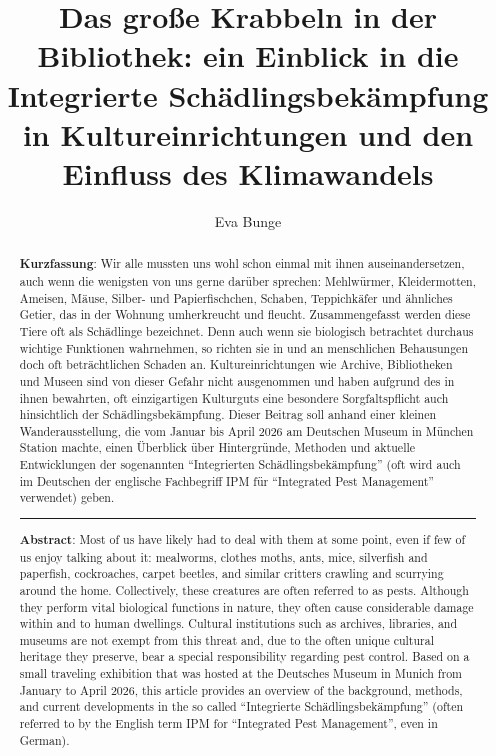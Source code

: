 \documentclass[a4paper,
fontsize=11pt,
oneside,
numbers=noperiodatend,
parskip=half-,
bibliography=totoc,
final
]{scrartcl}
\title{\LARGE{Das große Krabbeln in der Bibliothek: ein Einblick in die Integrierte Schädlingsbekämpfung in Kultureinrichtungen und den Einfluss des Klimawandels}}%
\author{Eva Bunge} %
\date{}
\begin{document}
\maketitle
\thispagestyle{fancyplain} 

\begin{abstract}
\noindent
\textbf{Kurzfassung}: Wir alle mussten uns wohl schon einmal mit ihnen
auseinandersetzen, auch wenn die wenigsten von uns gerne darüber
sprechen: Mehlwürmer, Kleidermotten, Ameisen, Mäuse, Silber- und
Papierfischchen, Schaben, Teppichkäfer und ähnliches Getier, das in der
Wohnung umherkreucht und fleucht. Zusammengefasst werden diese Tiere oft
als Schädlinge bezeichnet. Denn auch wenn sie biologisch betrachtet
durchaus wichtige Funktionen wahrnehmen, so richten sie in und an \linebreak
menschlichen Behausungen doch oft beträchtlichen Schaden an.
Kultureinrichtungen wie Archive, Bibliotheken und Museen sind von dieser
Gefahr nicht ausgenommen und haben aufgrund des in ihnen bewahrten, oft
einzigartigen Kulturguts eine besondere Sorgfaltspflicht auch
hinsichtlich der Schädlingsbekämpfung. Dieser Beitrag soll anhand einer
kleinen Wanderausstellung, die vom Januar bis April 2026 am Deutschen
Museum in München Station machte, einen Überblick über Hintergründe,
Methoden und aktuelle Entwicklungen der sogenannten \enquote{Integrierten
Schädlingsbekämpfung} (oft wird auch im Deutschen der englische
Fachbegriff IPM für \enquote{Integrated Pest Management} verwendet) geben.

\begin{center}\rule{0.5\linewidth}{0.5pt}\end{center}

\noindent\textbf{Abstract}: Most of us have likely had to deal with them at some
point, even if few of us enjoy talking about it: mealworms, clothes
moths, ants, mice, silverfish and paperfish, cockroaches, carpet
beetles, and similar critters crawling and scurrying around the home.
Collectively, these creatures are often referred to as pests. Although
they perform vital biological functions in nature, they often cause
considerable damage within and to human dwellings. Cultural institutions
such as archives, libraries, and museums are not exempt from this threat
and, due to the often unique cultural heritage they preserve, bear a
special responsibility regarding pest control. Based on a small
traveling exhibition that was hosted at the Deutsches Museum in Munich
from January to April 2026, this article provides an overview of the
background, methods, and current developments in the so called
\enquote{Integrierte Schädlingsbekämpfung} (often referred to by the English
term IPM for \enquote{Integrated Pest Management}, even in German).
\end{abstract}
\end{document}
